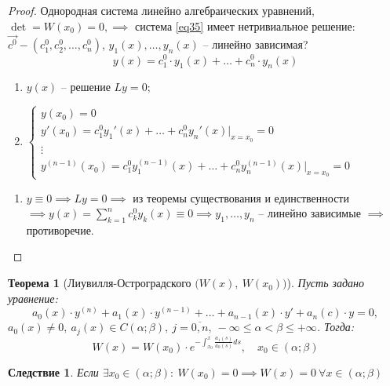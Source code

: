 \documentclass[11pt,a4paper,oneside]{report}
\theoremstyle{definition}
\theoremstyle{plain}
\newtheorem{theorem}{Теорема}[section]
\newtheorem*{effect}{Следствие}
\theoremstyle{remark}
\begin{document}
\begin{proof}
    Однородная система линейно алгебраических уравнений, $\det = W(x_0) = 0, \implies$ система \ref{eq35} имеет нетривиальное решение: $\overrightarrow{c^0} - (c_1^0,c_2^0,\ldots,c_n^0)$, $y_1(x),\ldots,y_n(x)$ -- линейно зависимая?
    \begin{equation*}
        y(x) = c_1^0 \cdot y_1(x) + \ldots + c_n^0 \cdot y_n(x)
    \end{equation*}
    \begin{enumerate}
        \item $y(x)$ -- решение $Ly = 0$;
        \item $\left\{\begin{array}{l}
                      y(x_0) = 0                                                        \\
                      y'(x_0) = c_1^0 y_1'(x) + \ldots + c_n^0y_n'(x)\bigg|_{x=x_0} = 0 \\
                      \vdots                                                            \\
                      y^{(n-1)}(x_0) = c_1^0 y_1^{(n-1)}(x) + \ldots + c_n^0y_n^{(n-1)}(x)\bigg|_{x=x_0} = 0
                  \end{array}\right.$
    \end{enumerate}
    \begin{enumerate}
        \item $y\equiv0 \implies Ly = 0 \implies$ из теоремы существования и единственности $\implies y(x) = \sum_{k=1}^{n}c_k^0 y_k(x) \equiv 0 \implies y_1,\ldots,y_n$ -- линейно зависимые $\implies$ противоречие.
    \end{enumerate}
\end{proof}

\begin{theorem}[Лиувилля-Остроградского $\big(W(x), \ W(x_0)\big)$]
    Пусть задано уравнение:
    \begin{equation*}
        a_0(x)\cdot y^{(n)} + a_1(x)\cdot y^{(n-1)} + \ldots + a_{n-1}(x)\cdot y' + a_n(c)\cdot y = 0,
    \end{equation*}
    $a_0(x) \ne 0, \ a_j(x)\in C(\alpha;\beta), \ j = \overline{0,n}, \ -\infty\leqslant\alpha<\beta\leqslant+\infty$. Тогда:
    \begin{equation*}
        W(x) = W(x_0) \cdot e^{-\int_{x_0}^{x}\frac{a_1(s)}{a_0(s)}ds}, \quad x_0 \in (\alpha;\beta)
    \end{equation*}
\end{theorem}

\begin{effect}
    Если $\exists x_0 \in (\alpha;\beta): \ W(x_0) = 0 \implies W(x) = 0 \ \forall x \in (\alpha;\beta)$
\end{effect}
\end{document}
